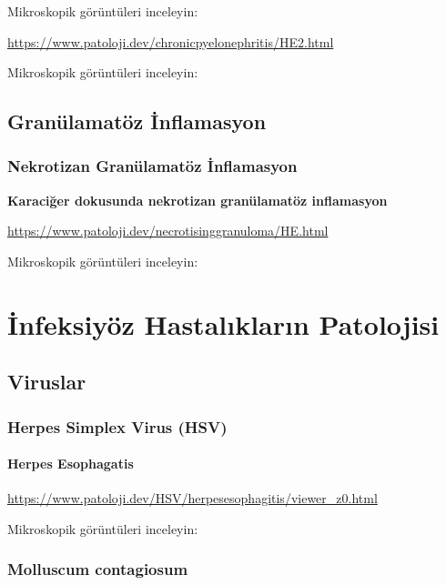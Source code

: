 \documentclass[
  letterpaper,
  DIV=11,
  numbers=noendperiod]{scrreprt}
\begin{document}
Mikroskopik görüntüleri inceleyin:

\url{https://www.patoloji.dev/chronicpyelonephritis/HE2.html}

Mikroskopik görüntüleri inceleyin:

\hypertarget{granuxfclamatuxf6z-inflamasyon}{%
\chapter{Granülamatöz
İnflamasyon}\label{granuxfclamatuxf6z-inflamasyon}}

\hypertarget{nekrotizan-granuxfclamatuxf6z-inflamasyon}{%
\section{Nekrotizan Granülamatöz
İnflamasyon}\label{nekrotizan-granuxfclamatuxf6z-inflamasyon}}

\textbf{Karaciğer dokusunda nekrotizan granülamatöz inflamasyon}

\url{https://www.patoloji.dev/necrotisinggranuloma/HE.html}

Mikroskopik görüntüleri inceleyin:

\part{İnfeksiyöz Hastalıkların Patolojisi}

\hypertarget{viruslar}{%
\chapter{Viruslar}\label{viruslar}}

\hypertarget{herpes-simplex-virus-hsv}{%
\section{Herpes Simplex Virus (HSV)}\label{herpes-simplex-virus-hsv}}

\hypertarget{herpes-esophagatis}{%
\subsection{Herpes Esophagatis}\label{herpes-esophagatis}}

\url{https://www.patoloji.dev/HSV/herpesesophagitis/viewer_z0.html}

Mikroskopik görüntüleri inceleyin:

\hypertarget{molluscum-contagiosum}{%
\section{Molluscum contagiosum}\label{molluscum-contagiosum}}
\end{document}
